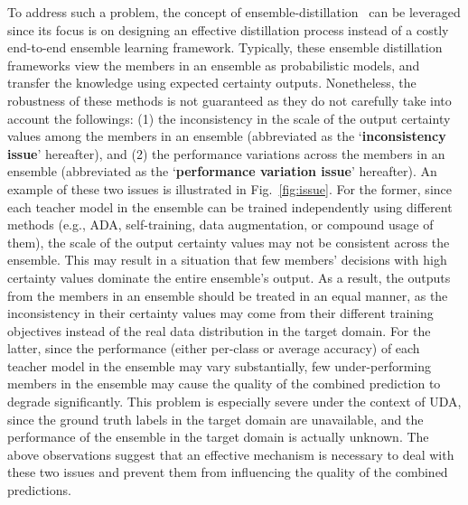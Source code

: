\documentclass[final]{cvpr}
\begin{document}
To address such a problem, the concept of ensemble-distillation~\cite{bucilua2006model, hinton2015distilling, cho2019efficacy, furlanello2018born, balan2015bayesian, nguyen2020joint, orbes2019knowledge, liu2019structured, malinin2019ensemble} can be leveraged since its focus is on designing an effective distillation process instead of a costly end-to-end ensemble learning framework. Typically, these ensemble distillation frameworks view the members in an ensemble as probabilistic models, and transfer the knowledge using expected certainty outputs. Nonetheless, the robustness of these methods is not guaranteed as they do not carefully take into account the followings:
(1) the inconsistency in the scale of the output certainty values among the members in an ensemble (abbreviated as the `\textbf{inconsistency issue}' hereafter), and (2) the performance variations across the members in an ensemble (abbreviated as the `\textbf{performance variation issue}' hereafter). An example of these two issues is illustrated in Fig.~\ref{fig:issue}. For the former, since each teacher model in the ensemble can be trained independently using different methods (e.g., ADA, self-training, data augmentation, or compound usage of them), the scale of the output certainty values may not be consistent across the ensemble. This may result in a situation that few members' decisions with high certainty values dominate the entire ensemble's output. As a result, the outputs from the members in an ensemble should be treated in an equal manner, as the inconsistency in their certainty values may come from their different training objectives instead of the real data distribution in the target domain. For the latter, since the performance (either per-class or average accuracy) of each teacher model in the ensemble may vary substantially, few under-performing members in the ensemble may cause the quality of the combined prediction to degrade significantly. This problem is especially severe under the context of UDA, since the ground truth labels in the target domain are unavailable, and the performance of the ensemble in the target domain is actually unknown.  The above observations suggest that an effective mechanism is necessary to deal with these two issues and prevent them from influencing the quality of the combined predictions.
\end{document}
